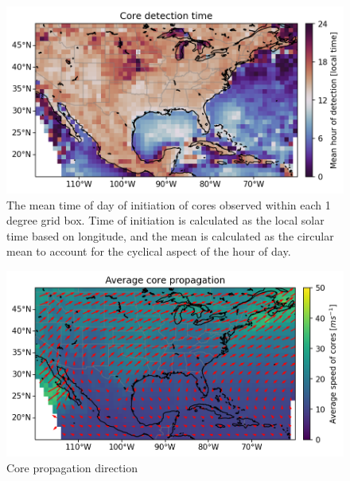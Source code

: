 \begin{figure}[tp]
    \centering
    \includegraphics[width=\textwidth]{figures/ch2_05.png}
    \caption[
    The mean time of day of initiation of cores observed within each 1 degree grid box
    ]{
    The mean time of day of initiation of cores observed within each 1 degree grid box. Time of initiation is calculated as the local solar time based on longitude, and the mean is calculated as the circular mean to account for the cyclical aspect of the hour of day.
    }
    \label{fig:core_detection_time_map}
\end{figure}

\begin{figure}[tp]
    \centering
    \includegraphics[width=\textwidth]{figures/ch2_06.png}
    \caption{Core propagation direction}
    \label{fig:core_propagation_map}
\end{figure}

